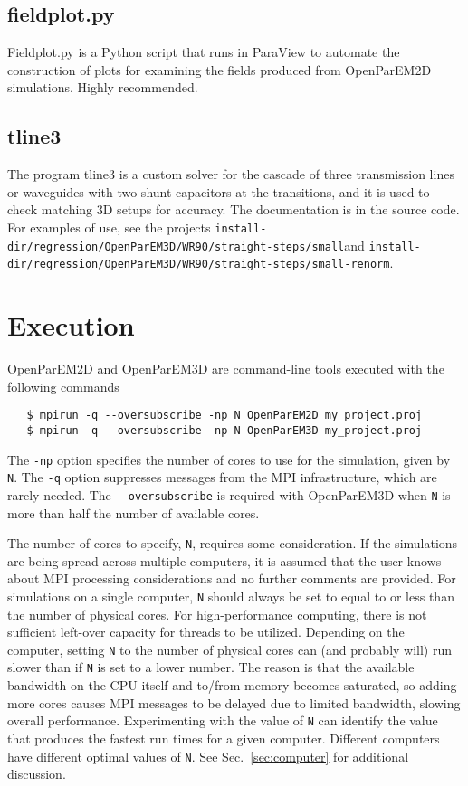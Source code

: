 \documentclass[titlepage]{article}
\renewcommand\_{\textunderscore\linebreak[1]}
\begin{document}
\subsection{field\_plot.py}
\label{sec:2Dplots}

Field\_plot.py is a Python script that runs in ParaView to automate the construction of plots for examining the fields produced from OpenParEM2D simulations.  Highly recommended.

\subsection{tline3}

The program tline3 is a custom solver for the cascade of three transmission lines or waveguides with two shunt capacitors at the transitions, and it is used to check matching 3D setups for accuracy.  The documentation is in the source code.  For examples of use, see the projects \newline\verb+install-dir/regression/OpenParEM3D/WR90/straight-steps/small+\newline and \newline \verb+install-dir/regression/OpenParEM3D/WR90/straight-steps/small-renorm+.

\section{Execution}

OpenParEM2D and OpenParEM3D are command-line tools executed with the following commands
\begin{verbatim}
   $ mpirun -q --oversubscribe -np N OpenParEM2D my_project.proj 
   $ mpirun -q --oversubscribe -np N OpenParEM3D my_project.proj 
\end{verbatim}

The \verb+-np+ option specifies the number of cores to use for the simulation, given by \verb+N+.  The \verb+-q+ option suppresses messages from the MPI infrastructure, which are rarely needed.  The \verb+--oversubscribe+ is required with OpenParEM3D when \verb+N+ is more than half the number of available cores.  

The number of cores to specify, \verb+N+, requires some consideration.  If the simulations are being spread across multiple computers, it is assumed that the user knows about MPI processing considerations and no further comments are provided.  For simulations on a single computer, \verb+N+ should always be set to equal to or less than the number of physical cores.  For high-performance computing, there is not sufficient left-over capacity for threads to be utilized.  Depending on the computer, setting \verb+N+ to the number of physical cores can (and probably will) run slower than if \verb+N+ is set to a lower number.  The reason is that the available bandwidth on the CPU itself and to/from memory becomes saturated, so adding more cores causes MPI messages to be delayed due to limited bandwidth, slowing overall performance.  Experimenting with the value of \verb+N+ can identify the value that produces the fastest run times for a given computer.  Different computers have different optimal values of \verb+N+.  See Sec.~\ref{sec:computer} for additional discussion.
\end{document}
